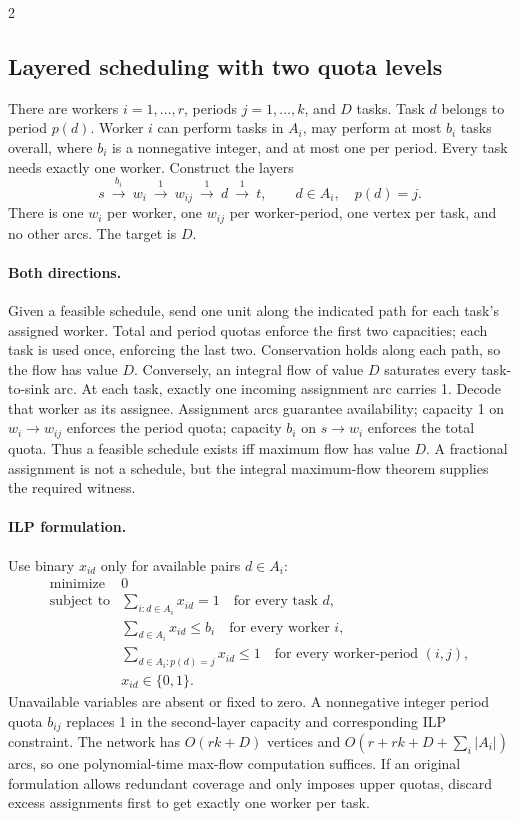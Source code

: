 \documentclass[8pt]{extarticle}
\theoremstyle{definition}
\begin{document}
\begin{multicols*}{2}
\subsection{Layered scheduling with two quota levels}\label{nf:scheduling}
There are workers $i=1,\ldots,r$, periods $j=1,\ldots,k$, and $D$ tasks.
Task $d$ belongs to period $p(d)$. Worker $i$ can perform tasks in $A_i$,
may perform at most $b_i$ tasks overall, where $b_i$ is a nonnegative integer, and at most one per period.
Every task needs exactly one worker. Construct the layers
\[
 s\ \xrightarrow{\ b_i\ }\ w_i
 \ \xrightarrow{\ 1\ }\ w_{ij}
 \ \xrightarrow{\ 1\ }\ d
 \ \xrightarrow{\ 1\ }\ t,
 \qquad d\in A_i,\quad p(d)=j.
\]
There is one $w_i$ per worker, one $w_{ij}$ per worker-period, one vertex per
task, and no other arcs. The target is $D$.

\paragraph{Both directions.}
Given a feasible schedule, send one unit along the indicated path for each
task's assigned worker. Total and period quotas enforce the first two
capacities; each task is used once, enforcing the last two. Conservation
holds along each path, so the flow has value $D$.
Conversely, an integral flow of value $D$ saturates every task-to-sink arc.
At each task, exactly one incoming assignment arc carries 1. Decode that
worker as its assignee. Assignment arcs guarantee availability; capacity 1
on $w_i\to w_{ij}$ enforces the period quota; capacity $b_i$ on $s\to w_i$
enforces the total quota. Thus a feasible schedule exists iff maximum flow
has value $D$. A fractional assignment is not a schedule, but the integral
maximum-flow theorem supplies the required witness.

\paragraph{ILP formulation.}
Use binary $x_{id}$ only for available pairs $d\in A_i$:
\[
\begin{array}{rl}
 \text{minimize}&0\\[1mm]
 \text{subject to}&\displaystyle\sum_{i:d\in A_i}x_{id}=1
                    \quad\text{for every task }d,\\[2mm]
 &\displaystyle\sum_{d\in A_i}x_{id}\le b_i
                    \quad\text{for every worker }i,\\[2mm]
 &\displaystyle\sum_{d\in A_i:p(d)=j}x_{id}\le1
                    \quad\text{for every worker-period }(i,j),\\[2mm]
 &x_{id}\in\{0,1\}.
\end{array}
\]
Unavailable variables are absent or fixed to zero. A nonnegative integer period quota $b_{ij}$
replaces 1 in the second-layer capacity and corresponding ILP constraint.
The network has $O(rk+D)$ vertices and
$O(r+rk+D+\sum_i|A_i|)$ arcs, so one polynomial-time max-flow computation
suffices. If an original formulation allows redundant coverage and only
imposes upper quotas, discard excess assignments first to get exactly one
worker per task.


\end{multicols*}
\end{document}
